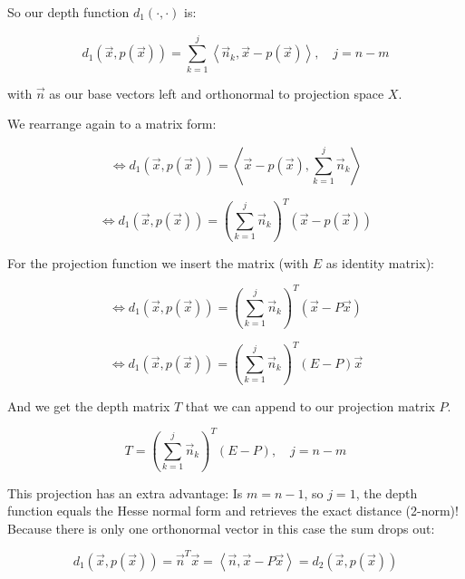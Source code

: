 \documentclass{article}
\newcommand{\lrangle}[1]{\left\langle #1 \right\rangle}
\begin{document}
So our depth function \(d_1(\cdot,\cdot)\) is:

    \begin{equation}
        d_1(\vec{x}, p(\vec{x})) = \sum_{k=1}^{j}{\lrangle{ \vec{n}_k, \vec{x}
        - p(\vec{x}) }}, \quad j = n -m
    \end{equation}

with \(\vec{n}\) as our base vectors left and orthonormal to projection space
\(X\).

We rearrange again to a matrix form:

    \begin{equation}
        \iff d_1(\vec{x}, p(\vec{x})) = \lrangle{ \vec{x} - p(\vec{x}),
        \sum_{k=1}^{j}{\vec{n}_k} }
    \end{equation}

    \begin{equation}
        \iff d_1(\vec{x}, p(\vec{x})) = (\sum_{k=1}^{j}{\vec{n}_k})^T
        (\vec{x} - p(\vec{x}))
    \end{equation}

For the projection function we insert the matrix (with \(E\) as identity
matrix):

    \begin{equation}
        \iff d_1(\vec{x}, p(\vec{x})) = (\sum_{k=1}^{j}{\vec{n}_k})^T
        (\vec{x} - P\vec{x})
    \end{equation}

    \begin{equation}
        \iff d_1(\vec{x}, p(\vec{x})) = (\sum_{k=1}^{j}{\vec{n}_k})^T (E - P)
        \vec{x}
    \end{equation}

And we get the depth matrix \(T\) that we can append to our projection matrix
\(P\).

    \begin{equation}
        T = (\sum_{k=1}^{j}{\vec{n}_k})^T (E-P), \quad j = n - m
    \end{equation}

This projection has an extra advantage: Is \(m = n - 1\), so \(j = 1\), the
depth function equals the Hesse normal form and retrieves the exact distance
(2-norm)! Because there is only one orthonormal vector in this case the sum
drops out:

    \begin{equation}
        d_1(\vec{x}, p(\vec{x})) = \vec{n}^T \vec{x} = \lrangle{ \vec{n},
        \vec{x} - P\vec{x}} = d_2(\vec{x}, p(\vec{x}))
    \end{equation}
\end{document}

